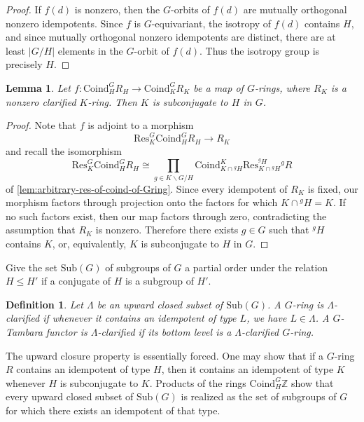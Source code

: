 \documentclass[11pt,dvipsnames]{amsart}
\newcommand{\Z}{\mathbb{Z}}
\newtheorem{lemma}[theorem]{Lemma}
\theoremstyle{BoldRemark}
\newtheorem{definition}[theorem]{Definition}
\begin{document}
\begin{proof}
	If $f(d)$ is nonzero, then the $G$-orbits of $f(d)$ are mutually orthogonal nonzero idempotents. Since $f$ is $G$-equivariant, the isotropy of $f(d)$ contains $H$, and since mutually orthogonal nonzero idempotents are distinct, there are at least $|G/H|$ elements in the $G$-orbit of $f(d)$. Thus the isotropy group is precisely $H$.
\end{proof}

\begin{lemma}\label{lem:no-Gring-maps-which-decrease-coinduction}
	Let $f : \mathrm{Coind}_H^G R_H \rightarrow \mathrm{Coind}_K^G R_K$ be a map of $G$-rings, where $R_K$ is a nonzero clarified $K$-ring. Then $K$ is subconjugate to $H$ in $G$.
\end{lemma}

\begin{proof}
	Note that $f$ is adjoint to a morphism \[ \mathrm{Res}_K^G \mathrm{Coind}_H^G R_H \rightarrow R_K \] and recall the isomorphism \[ \mathrm{Res}_K^G \mathrm{Coind}_H^G R_H \cong \prod_{g \in K \backslash G / H} \mathrm{Coind}_{K \cap {}^g H}^K \mathrm{Res}_{K \cap {}^g H}^{{}^g H} {}^g R \] of \cref{lem:arbitrary-res-of-coind-of-Gring}. Since every idempotent of $R_K$ is fixed, our morphism factors through projection onto the factors for which $K \cap {}^g H = K$. If no such factors exist, then our map factors through zero, contradicting the assumption that $R_K$ is nonzero. Therefore there exists $g \in G$ such that ${}^g H$ contains $K$, or, equivalently, $K$ is subconjugate to $H$ in $G$.
\end{proof}

Give the set $\mathrm{Sub}(G)$ of subgroups of $G$ a partial order under the relation $H \leq H'$ if a conjugate of $H$ is a subgroup of $H'$.

\begin{definition}
	Let $\Lambda$ be an upward closed subset of $\mathrm{Sub}(G)$. A $G$-ring is \emph{$\Lambda$-clarified} if whenever it contains an idempotent of type $L$, we have $L \in \Lambda$. A $G$-Tambara functor is $\Lambda$-clarified if its bottom level is a $\Lambda$-clarified $G$-ring.
\end{definition}

The upward closure property is essentially forced. One may show that if a $G$-ring $R$ contains an idempotent of type $H$, then it contains an idempotent of type $K$ whenever $H$ is subconjugate to $K$. Products of the rings $\mathrm{Coind}_H^G \Z$ show that every upward closed subset of $\mathrm{Sub}(G)$ is realized as the set of subgroups of $G$ for which there exists an idempotent of that type.
\end{document}
